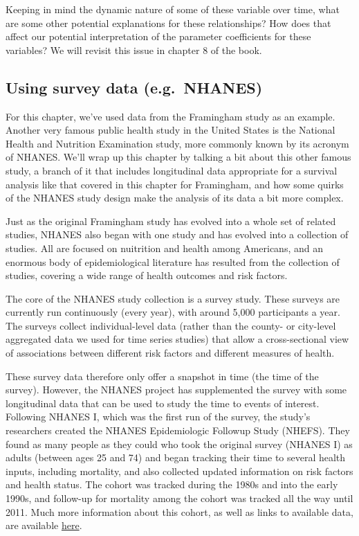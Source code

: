 \documentclass[
]{book}
\begin{document}
Keeping in mind the dynamic nature of some of these variable over time, what are some other potential explanations for these relationships? How does that affect our potential interpretation of the parameter coefficients for these variables? We will revisit this issue in chapter 8 of the book.

\hypertarget{using-survey-data-e.g.-nhanes}{%
\subsection{Using survey data (e.g.~NHANES)}\label{using-survey-data-e.g.-nhanes}}

For this chapter, we've used data from the Framingham study as an example. Another very famous public health study in the United States is the National Health and Nutrition Examination study, more commonly known by its acronym of NHANES. We'll wrap up this chapter by talking a bit about this other famous study, a branch of it that includes longitudinal data appropriate for a survival analysis like that covered in this chapter for Framingham, and how some quirks of the NHANES study design make the analysis of its data a bit more complex.

Just as the original Framingham study has evolved into a whole set of related studies, NHANES also began with one study and has evolved into a collection of studies. All are focused on nuitrition and health among Americans, and an enormous body of epidemiological literature has resulted from the collection of studies, covering a wide range of health outcomes and risk factors.

The core of the NHANES study collection is a survey study. These surveys are currently run continuously (every year), with around 5,000 participants a year. The surveys collect individual-level data (rather than the county- or city-level aggregated data we used for time series studies) that allow a cross-sectional view of associations between different risk factors and different measures of health.

These survey data therefore only offer a snapshot in time (the time of the survey). However, the NHANES project has supplemented the survey with some longitudinal data that can be used to study the time to events of interest. Following NHANES I, which was the first run of the survey, the study's researchers created the NHANES Epidemiologic Followup Study (NHEFS). They found as many people as they could who took the original survey (NHANES I) as adults (between ages 25 and 74) and began tracking their time to several health inputs, including mortality, and also collected updated information on risk factors and health status. The cohort was tracked during the 1980s and into the early 1990s, and follow-up for mortality among the cohort was tracked all the way until 2011. Much more information about this cohort, as well as links to available data, are available \href{https://wwwn.cdc.gov/nchs/nhanes/nhefs/default.aspx/\#dfd}{here}.
\end{document}
